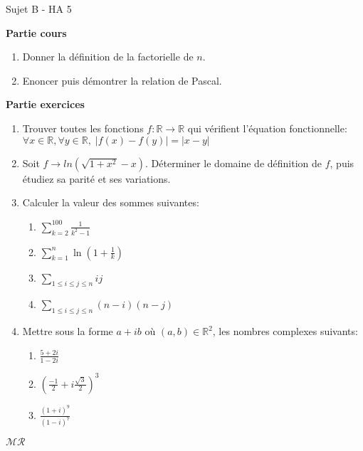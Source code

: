 \documentclass[a4paper,11pt, landscape]{article}
\begin{document}
\begin{multicols*}{3}
\vfill\null
\columnbreak
\centerline{Sujet B - HA 5}

\begin{flushleft}
  \textbf{Partie cours} 
\end{flushleft} 
\begin{enumerate}[leftmargin=*]
  \item Donner la définition de la factorielle de $n$.
  \item Enoncer puis démontrer la relation de Pascal.
\end{enumerate}
\textbf{Partie exercices}
\begin{enumerate}[leftmargin=*]
  \item Trouver toutes les fonctions $f : \mathbb{R} \rightarrow \mathbb{R}$ qui vérifient l'équation fonctionnelle: $\forall x \in \mathbb{R}, \forall y \in \mathbb{R}, \; |f(x) - f(y)| = |x - y|$
  \item Soit $f \rightarrow ln\left(\sqrt{1 + x^2} - x\right)$. Déterminer le domaine de définition de $f$, puis étudiez sa parité et ses variations.
\item Calculer la valeur des sommes suivantes:
\begin{enumerate}
  \item $\sum\limits_{k=2}^{100}\frac{1}{k^2-1}$
  \item $\sum\limits_{k=1}^{n}\ln\left(1+\frac{1}{k}\right)$
  \item $\sum\limits_{1\leq i \leq j \leq n}ij$
  \item $\sum\limits_{1\leq i \leq j \leq n}(n-i)(n-j)$
\end{enumerate}  
\item Mettre sous la forme $a + ib$ où $(a,b) \in \mathbb{R}^2$, les nombres complexes suivants:
\begin{enumerate}
  \item $\frac{5+2i}{1-2i}$
  \item $\left(\frac{-1}{2} + i\frac{\sqrt{3}}{2}\right)^3$
  \item $\frac{(1+i)^9}{(1-i)^7}$
\end{enumerate}
\end{enumerate}
\centerline{$\mathcal{MR}$}
\vfill\null
\columnbreak

\end{multicols*}
\end{document}
